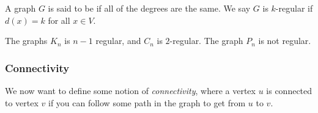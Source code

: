 \documentclass[a4paper]{scrartcl}
\begin{document}

\begin{definition}[Regularity]
	A graph $G$ is said to be  if all of the degrees are the same. We say $G$ is $k$-regular if $d(x) = k$ for all $x \in V$.
\end{definition}

\begin{example}
	The graphs $K_n$ is $n - 1$ regular, and $C_n$ is $2$-regular.
	The graph $P_n$ is not regular.
\end{example}

\subsubsection{Connectivity}

We now want to define some notion of \emph{connectivity}, where a vertex $u$ is connected to vertex $v$ if you can follow some path in the graph to get from $u$ to $v$.
\end{document}
